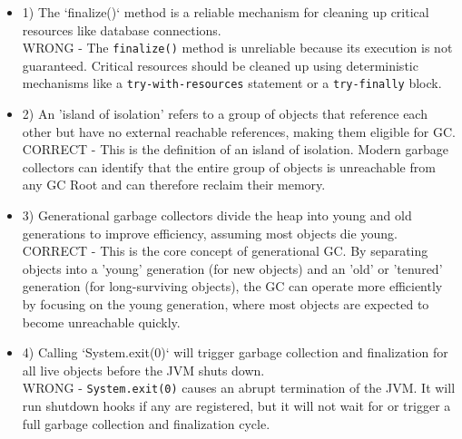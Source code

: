 \documentclass[12pt]{article}
\begin{document}
\begin{enumerate}[label=(\arabic*)]
\begin{itemize}
\item 1) The `finalize()` method is a reliable mechanism for cleaning up critical resources like database connections.
 \\ 
WRONG - The \verb|finalize()| method is unreliable because its execution is not guaranteed. Critical resources should be cleaned up using deterministic mechanisms like a \verb|try-with-resources| statement or a \verb|try-finally| block.

\item 2) An 'island of isolation' refers to a group of objects that reference each other but have no external reachable references, making them eligible for GC.
 \\ 
CORRECT - This is the definition of an island of isolation. Modern garbage collectors can identify that the entire group of objects is unreachable from any GC Root and can therefore reclaim their memory.

\item 3) Generational garbage collectors divide the heap into young and old generations to improve efficiency, assuming most objects die young.
 \\ 
CORRECT - This is the core concept of generational GC. By separating objects into a 'young' generation (for new objects) and an 'old' or 'tenured' generation (for long-surviving objects), the GC can operate more efficiently by focusing on the young generation, where most objects are expected to become unreachable quickly.

\item 4) Calling `System.exit(0)` will trigger garbage collection and finalization for all live objects before the JVM shuts down.
 \\ 
WRONG - \verb|System.exit(0)| causes an abrupt termination of the JVM. It will run shutdown hooks if any are registered, but it will not wait for or trigger a full garbage collection and finalization cycle.


\end{itemize}
\end{enumerate}
\end{document}

